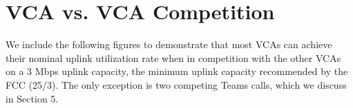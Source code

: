 
\newpage
\appendix
\thispagestyle{plain}

\setcounter{figure}{0}
\renewcommand\thefigure{A.\arabic{figure}}

\setcounter{table}{0}
\renewcommand\thetable{A.\arabic{table}}

\section{VCA vs. VCA Competition}
\label{appendix:vca_vs_vca}
We include the following figures to demonstrate that most VCAs can achieve their
nominal uplink utilization rate when in competition with the other VCAs on a 
3 Mbps uplink capacity, the minimum uplink capacity recommended by the FCC (25/3). 
The only exception is two competing Teams calls, which we discuss in Section 5. 




